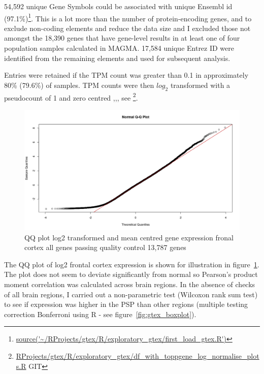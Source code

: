 54,592 unique Gene Symbols could be associated with unique Ensembl id (97.1\%)\footnote{\url{source('~/RProjects/gtex/R/exploratory_gtex/first_load_gtex.R')}}. This is a lot more than the number of protein-encoding genes, and to exclude non-coding elements and reduce the data size and I excluded those not amongst the 18,390 genes that have gene-level results in at least one of four population samples calculated in MAGMA. 17,584 unique Entrez ID were identified from the remaining elements and used for subsequent analysis.

Entries were retained if the TPM count was greater than 0.1 in approximately 80\% (79.6\%) of samples. TPM counts were then $log_2$ transformed with a pseudocount of 1 and zero centred  \cite{sniekers2017genome},\cite{taskesen20162d},\cite{mele2015human}, see \cite{zhao2017gene}\footnote{\url{RProjects/gtex/R/exploratory_gtex/df_with_toppgene_log_normalise_plots.R} GIT}.



\begin{figure}
    \centering
    \includegraphics[width=\textwidth]{images/Rplot_rough_qq.png}
    \caption{QQ plot log2 transformed and mean centred gene expression fronal cortex all genes passing quality control 13,787 genes}
    \label{fig:qqplot frontal cortex}
\end{figure}

The QQ plot of log2 frontal cortex expression is shown for illustration in figure~\ref{fig:qqplot frontal cortex}. The plot does not seem to deviate significantly from normal so Pearson's product moment correlation was calculated across brain regions. In the absence of checks of all brain regions, I carried out a non-parametric test (Wilcoxon rank sum test) to see if expression was higher in the PSP than other regions (multiple testing correction Bonferroni using R - see figure~\ref{fig:gtex_boxplot}).


